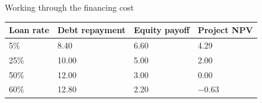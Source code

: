 \documentclass[12pt,aspectratio=169]{beamer}
\begin{document}
\begin{frame}{Working through the financing cost}
\begin{center}\begin{tabular}{@{}llll@{}}\toprule \textbf{Loan rate} & \textbf{Debt repayment} & \textbf{Equity payoff} & \textbf{Project NPV}\\\midrule 5\% & 8.40 & 6.60 & 4.29\\[2mm]
25\% & 10.00 & 5.00 & 2.00\\[2mm]
50\% & 12.00 & 3.00 & 0.00\\[2mm]
60\% & 12.80 & 2.20 & $-0.63$\\\bottomrule\end{tabular}\end{center}
\end{frame}

\end{document}
